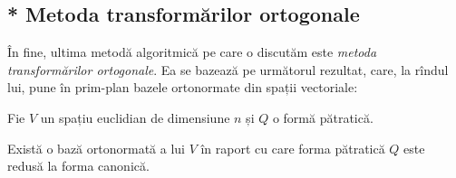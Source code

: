 
\subsection{* Metoda transformărilor ortogonale}

\indent\indent În fine, ultima metodă algoritmică pe care o discutăm este
\emph{metoda transformărilor ortogonale}. Ea se bazează pe următorul rezultat, 
care, la rîndul lui, pune în prim-plan bazele ortonormate din spații vectoriale:
\begin{theorem}
	Fie $V$ un spațiu euclidian de dimensiune $n$ și $Q$ o formă pătratică.

Există o bază ortonormată a lui $V$ în raport cu care forma pătratică $Q$ este
redusă la forma canonică.
\end{theorem}

